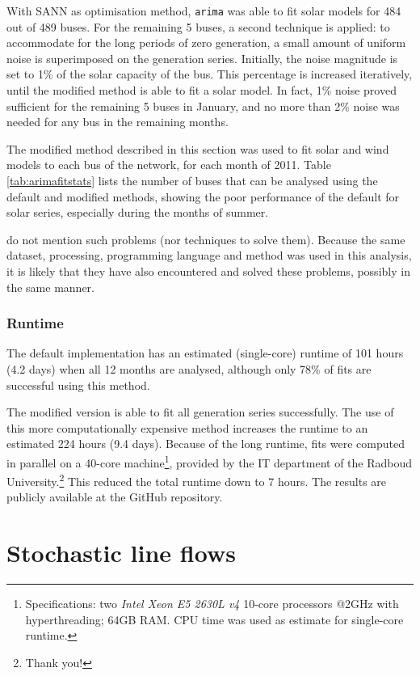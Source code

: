 \documentclass[main.tex]{subfiles}
\begin{document}
With SANN as optimisation method, \texttt{arima} was able to fit solar models for 484 out of 489 buses. For the remaining 5 buses, a second technique is applied: to accommodate for the long periods of zero generation, a small amount of uniform noise is superimposed on the generation series. Initially, the noise magnitude is set to 1\% of the solar capacity of the bus. This percentage is increased iteratively, until the modified method is able to fit a solar model. In fact, 1\% noise proved sufficient for the remaining 5 buses in January, and no more than 2\% noise was needed for any bus in the remaining months.

The modified method described in this section was used to fit solar and wind models to each bus of the network, for each month of 2011. Table \ref{tab:arimafitstats} lists the number of buses that can be analysed using the default and modified methods, showing the poor performance of the default for solar series, especially during the months of summer.

\citet{Nesti2018emergentfailures} do not mention such problems (nor techniques to solve them). Because the same dataset, processing, programming language and method was used in this analysis, it is likely that they have also encountered and solved these problems, possibly in the same manner.

\subsubsection{Runtime}
The default implementation has an estimated (single-core) runtime of 101 hours (4.2 days) when all 12 months are analysed, although only 78\% of fits are successful using this method.

The modified version is able to fit all generation series successfully. The use of this more computationally expensive method increases the runtime to an estimated 224 hours (9.4 days). Because of the long runtime, fits were computed in parallel on a 40-core machine\footnote{Specifications: two \textit{Intel Xeon E5 2630L v4} 10-core processors @2GHz with hyperthreading; 64GB RAM. CPU time was used as estimate for single-core runtime.}, provided by the IT department of the Radboud University.\footnote{Thank you!} This reduced the total runtime down to 7 hours. The results are publicly available at the GitHub repository.

\section{Stochastic line flows}
\end{document}

